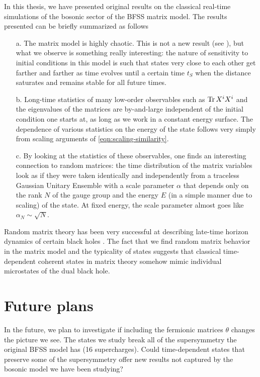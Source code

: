 In this thesis, we have presented original results on the classical real-time simulations of the bosonic sector of the BFSS matrix model. The results presented can be briefly summarized as follows
\begin{enumerate}
    \item[a.] The matrix model is highly chaotic. This is not a new result (see \cite{Berkowitz:2016znt,Gur-Ari:2015rcq}), but what we observe is something really interesting: the nature of sensitivity to initial conditions in this model is such that states very close to each other get farther and farther as time evolves until a certain time $t_S$ when the distance saturates and remains stable for all future times.
    \item[b.] Long-time statistics of many low-order observables such as $\Tr X^i X^i$ and the eigenvalues of the matrices are by-and-large independent of the initial condition one starts at, as long as we work in a constant energy surface. The dependence of various statistics on the energy of the state follows very simply from scaling arguments of \cref{eqn:scaling-similarity}.
    \item[c.] By looking at the statistics of these observables, one finds an interesting connection to random matrices: the time distribution of the matrix variables look as if they were taken identically and independently from a traceless Gaussian Unitary Ensemble with a scale parameter $\alpha$ that depends only on the rank $N$ of the gauge group and the energy $E$ (in a simple manner due to scaling) of the state. At fixed energy, the scale parameter almost goes like $\alpha_N \sim \sqrt{N}$.
\end{enumerate}
Random matrix theory has been very successful at describing late-time horizon dynamics of certain black holes \cite{Cotler:2016fpe}. The fact that we find random matrix behavior in the matrix model and the typicality of states suggests that classical time-dependent coherent states in matrix theory somehow mimic individual microstates of the dual black hole.

\section{Future plans}

In the future, we plan to investigate if including the fermionic matrices $\theta$ changes the picture we see. The states we study break all of the supersymmetry the original BFSS model has (16 supercharges). Could time-dependent states that preserve some of the supersymmetry offer new results not captured by the bosonic model we have been studying?

